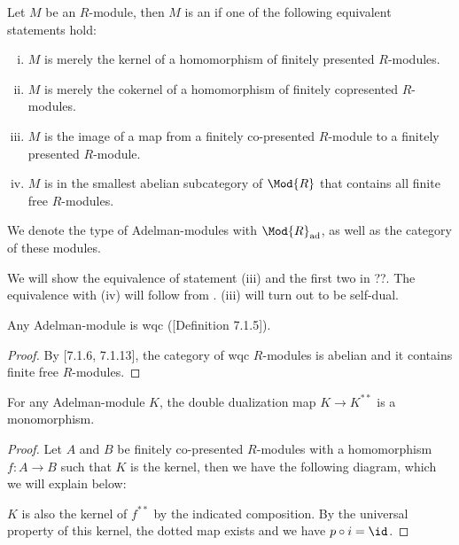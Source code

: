 \begin{definition}
  Let $M$ be an $R$-module, then $M$ is an  if one of the following equivalent statements hold:
  \begin{enumerate}[(i)]
  \item $M$ is merely the kernel of a homomorphism of finitely presented $R$-modules.
  \item $M$ is merely the cokernel of a homomorphism of finitely copresented $R$-modules.
  \item $M$ is the image of a map from a finitely co-presented $R$-module to a finitely presented $R$-module.
  \item $M$ is in the smallest abelian subcategory of $\Mod{R}$ that contains all finite free $R$-modules.
  \end{enumerate}
  We denote the type of Adelman-modules with $\Mod{R}_{\mathrm{ad}}$, as well as the category of these modules.
\end{definition}
We will show the equivalence of statement (iii) and the first two in ??.
The equivalence with (iv) will follow from .
(iii) will turn out to be self-dual.

\begin{remark}
  Any Adelman-module is wqc (\cite{draft}[Definition 7.1.5]).
\end{remark}

\begin{proof}
  By \cite{draft}[7.1.6, 7.1.13], the category of wqc $R$-modules is abelian and it contains finite free $R$-modules.
\end{proof}

\begin{lemma}
  \label{coherent-double-dual-mono}
  For any Adelman-module $K$, the double dualization map $K\to K^{\ast\ast}$ is a monomorphism.
\end{lemma}

\begin{proof}
  Let $A$ and $B$ be finitely co-presented $R$-modules with a homomorphism $f:A\to B$ such that $K$ is the kernel, then we have the following diagram, which we will explain below:
\begin{center}
\end{center}
$K$ is also the kernel of $f^{\ast\ast}$ by the indicated composition.
By the universal property of this kernel, the dotted map exists and we have $p\circ i=\id$.
\end{proof}

